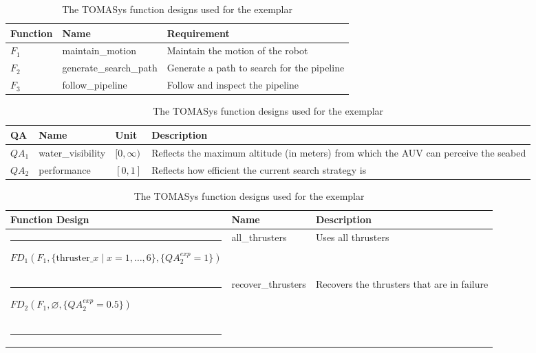 \begin{table}
    \centering
    \caption{The TOMASys functions used for the exemplar}\label{tbl:functions_exemplar}
    \begin{tabular}{|@{\;}l@{\;}|@{\;}l@{\:}|p{4.7cm}@{\:}|}
        \hline
        \textbf{Function} & \textbf{Name} & \textbf{Requirement} \\
        \hline
        \rule{0pt}{2ex}
        $F_1$ & maintain\_motion & Maintain the motion of the robot\\
        \hline
        \rule{0pt}{2ex}
        $F_2$ & generate\_search\_path & Generate a path to search for the pipeline\\
        \hline
        \rule{0pt}{2ex}
        $F_3$ & follow\_pipeline & Follow and inspect the pipeline\\
        \hline
    \end{tabular}
\bigskip
\caption{The TOMASys quality attributes used for the exemplar}\label{tbl:qas_exemplar}
    \begin{tabular}{|l|l|l|p{3.9cm}|}
        \hline
        \rule{0pt}{2ex}
        \textbf{QA} & \textbf{Name} & \textbf{Unit} & \textbf{Description}\\
        \hline
        \rule{0pt}{2ex}
        $QA_1$ & water\_visibility & $\lbrack 0,\infty\rparen$ & Reflects the maximum altitude (in meters) from which the AUV can perceive the seabed\\
        \hline
        \rule{0pt}{2ex}
        $QA_2$ & performance & $[0,1]$ & Reflects how efficient the current search strategy is\\
        \hline
    \end{tabular}
\bigskip
\caption{The TOMASys function designs used for the exemplar}\label{tbl:function_designs_exemplar}
    \begin{tabular}{|@{\;}>{\raggedright\arraybackslash}p{3.5cm}@{\;\,}|@{\;}p{3.0cm}@{\,}|>{\raggedright\arraybackslash}p{2.7cm}@{\;}|}
        \hline
        \textbf{Function Design} & \textbf{Name} & \textbf{Description} \\
        \hline
        \rule{-3pt}{2ex}
        $FD_1(F_1,\{\text{thruster}\_x\mid x=1,\dots,6\}, \{QA_2^{exp}=1\})$ & all\_thrusters & Uses all thrusters \\ %
        \hline
        \rule{-3pt}{2ex}
        $FD_2(F_1, \varnothing, \{QA_2^{exp}=0.5\})$ & recover\_thrusters & Recovers the thrusters that are in failure\\ %
        \hline
        \rule{-3pt}{2ex}

\end{tabular}
\end{table}
